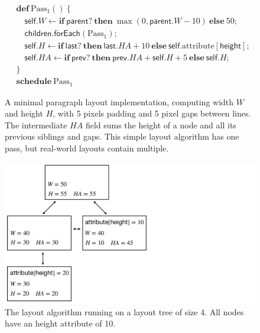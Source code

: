 \begin{figure}
\begin{minipage}[b]{0.68\linewidth}
\begin{align*}
& \mathbf{def}\:\text{Pass}_1()\:\{ \\
& \quad \mathsf{self}.W \gets
        \mathbf{if}\:\mathsf{parent}?\:
        \mathbf{then}\:\operatorname{max}(0, \mathsf{parent}.W - 10)\:
        \mathbf{else}\:50; \\
& \quad \mathsf{children}.\mathsf{forEach}(\text{Pass}_1); \\
& \quad \mathsf{self}.H \gets
        \mathbf{if}\:\mathsf{last}?\:
        \mathbf{then}\:\mathsf{last}.HA + 10\:
        \mathbf{else}\:\mathsf{self}.\text{attribute}[\mathsf{height}]; \\
& \quad \mathsf{self}.HA \gets
        \mathbf{if}\:\mathsf{prev}?\:
        \mathbf{then}\:\mathsf{prev}.HA + \mathsf{self}.H + 5\:
        \mathbf{else}\:\mathsf{self}.H; \\
& \} \\
& \mathbf{schedule}\:\text{Pass}_1
\end{align*}
\caption{
  A minimal paragraph layout implementation,
    computing width $W$ and height $H$,
    with 5 pixels padding and 5 pixel gaps between lines.
  The intermediate $HA$ field sums the height
    of a node and all its previous siblings and gaps.
  This simple layout algorithm has one pass,
    but real-world layouts contain multiple.
}
\label{fig:layout-simple}
\end{minipage}\hfill%
\begin{minipage}[b]{0.28\linewidth}
\centering
\includegraphics[width=\linewidth,trim=0 0 11in 0,clip]{LayoutExample.pdf}
\caption{The layout algorithm running on a layout tree of size 4. All nodes have an height attribute of 10.
}
\end{minipage}
\end{figure}
